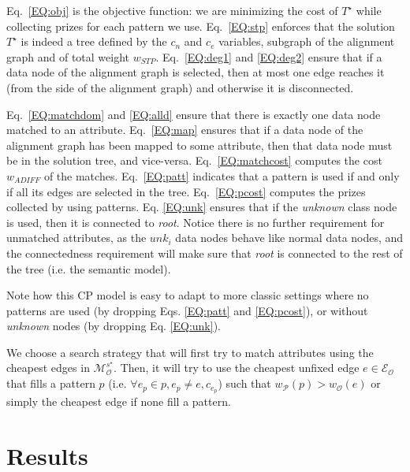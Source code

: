 \documentclass[letterpaper]{article} %
\newcommand{\ignore}[1]{}
\begin{document}
Eq.~\ref{EQ:obj} is the objective function: we are minimizing the cost 
of $T^\star$ while collecting prizes for each pattern we use. 
Eq.~\ref{EQ:stp} enforces that the solution 
$T^\star$ is indeed a tree defined by the $c_n$ and $c_e$ variables,
subgraph of the alignment graph 
and of total weight $w_{STP}$. 
Eq.~\ref{EQ:deg1} and \ref{EQ:deg2} ensure 
that if a data node of the alignment graph is selected, then at most one edge 
reaches it (from the side of the alignment graph) and otherwise it is 
disconnected. 
\ignore{Eq. \ref{EQ:matchdom} ensures that the domain of each 
variable in 
the array $match$ corresponds to a subset of data nodes of the alignment graph 
for which there is an edge connecting to the attribute at hand. 
Eq.~\ref{EQ:alld} ensure that each attribute is mapped to exactly one data node of 
the alignment graph.}
Eq.~\ref{EQ:matchdom} and \ref{EQ:alld} ensure that 
there is exactly one data node matched to an attribute. 
Eq.~\ref{EQ:map} ensures that 
if a data node of the alignment graph has been mapped to some attribute, then 
that data node must be in the solution tree, and vice-versa. 
Eq.~\ref{EQ:matchcost} computes the cost $w_{ADIFF}$ of the matches.
Eq.~\ref{EQ:patt} indicates that a pattern is used if and only if all its edges are selected in the tree. 
Eq.~\ref{EQ:pcost} computes the prizes collected by using patterns.
Eq. \ref{EQ:unk} ensures that if the \emph{unknown} class node is used, then it 
is connected to \emph{root}.
Notice there is no further requirement for unmatched attributes, as the 
$unk_i$ data nodes behave like normal data nodes, and the connectedness 
requirement will make sure that \emph{root} is connected to the rest of the 
tree (i.e. the semantic model).

Note how this CP model is easy to adapt to more classic settings where no 
patterns are used (by dropping Eqs. \ref{EQ:patt} and \ref{EQ:pcost}), or 
without \emph{unknown} nodes (by dropping Eq. \ref{EQ:unk}).

We choose a search strategy that will first try to match attributes using the cheapest edges in $\mathcal{M}_\mathcal{O}^{s^\star}$. Then, it will try to use the cheapest unfixed edge $e\in\mathcal{E_O}$ that fills a pattern $p$ (i.e. $\forall e_p\in p, e_p \neq e, c_{e_p}$) such that $w_\mathcal{P}(p) > w_\mathcal{O}(e)$ or simply the cheapest edge if none fill a pattern.

\section{Results \label{SEC:Res}}
\end{document}
